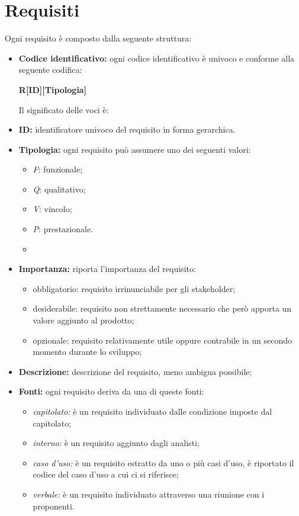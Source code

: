 \section{Requisiti}
Ogni requisito è composto dalla seguente struttura:
\begin{itemize}
    \item \textbf{Codice identificativo:} ogni codice identificativo è univoco e conforme alla seguente codifica:
          \begin{center}
              \textbf{R[ID][Tipologia]}
          \end{center}
          Il significato delle voci è:
    \item \textbf{ID:} identificatore univoco del requisito in forma gerarchica.
    \item \textbf{Tipologia:} ogni requisito può assumere uno dei seguenti valori:
          \begin{itemize}
              \item \textit{F}: funzionale;
              \item \textit{Q}: qualitativo;
              \item \textit{V}: vincolo;
              \item \textit{P}: prestazionale.
              \item
          \end{itemize}
    \item \textbf{Importanza:} riporta l'importanza del requisito:
          \begin{itemize}
              \item obbligatorio: requisito irrinunciabile per gli stakeholder;
              \item desiderabile: requisito non strettamente necessario che però apporta un valore aggiunto al prodotto;
              \item opzionale: requisito relativamente utile oppure contrabile in un secondo momento durante lo sviluppo;
          \end{itemize}
    \item \textbf{Descrizione:} descrizione del requisito, meno ambigua possibile;
    \item \textbf{Fonti:} ogni requisito deriva da una di queste fonti:
          \begin{itemize}
              \item \textit{capitolato:} è un requisito individuato dalle condizione imposte dal capitolato;
              \item \textit{interno:} è un requisito aggiunto dagli analisti;
              \item \textit{caso d'uso:} è un requisito estratto da uno o più casi d'uso, è riportato il codice del caso d'uso a cui ci si riferisce;
              \item \textit{verbale:} è un requisito individuato attraverso una riunione con i proponenti.
          \end{itemize}
\end{itemize}

